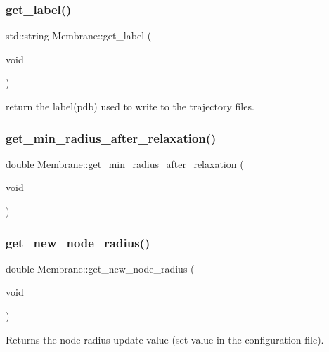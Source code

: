 \subsubsection{\texorpdfstring{get\_label()}{get\_label()}}
{\footnotesize\ttfamily std\+::string Membrane\+::get\+\_\+label (\begin{DoxyParamCaption}\item[{void}]{ }\end{DoxyParamCaption})\hspace{0.3cm}{\ttfamily [inline]}}

return the label(pdb) used to write to the trajectory files. \mbox{\label{classMembrane_a629f4f8d87ef7b83130cf18e8de060bb}} 
\subsubsection{\texorpdfstring{get\_min\_radius\_after\_relaxation()}{get\_min\_radius\_after\_relaxation()}}
{\footnotesize\ttfamily double Membrane\+::get\+\_\+min\+\_\+radius\+\_\+after\+\_\+relaxation (\begin{DoxyParamCaption}\item[{void}]{ }\end{DoxyParamCaption})\hspace{0.3cm}{\ttfamily [inline]}}

\mbox{\label{classMembrane_a8a0ab2bcb15628b748a1c8322b8ea803}} 
\subsubsection{\texorpdfstring{get\_new\_node\_radius()}{get\_new\_node\_radius()}}
{\footnotesize\ttfamily double Membrane\+::get\+\_\+new\+\_\+node\+\_\+radius (\begin{DoxyParamCaption}\item[{void}]{ }\end{DoxyParamCaption})\hspace{0.3cm}{\ttfamily [inline]}}

Returns the node radius update value (set value in the configuration file). \mbox{\label{classMembrane_a7b6e284f4bba349da2ddc1c14f914dc7}} 
